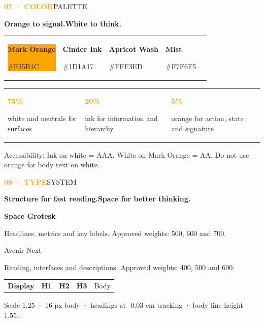 \documentclass[a4paper,10pt]{article}
\newcommand{\PageLabel}[2]{\noindent\textcolor{orange}{\footnotesize\bfseries #1}\hfill\textcolor{ink!55}{\footnotesize #2}\par\vspace{5mm}}
\newcommand{\Title}[1]{{\displayfont\bfseries\fontsize{34}{38}\selectfont\color{ink}#1\par}}
\newcommand{\Sub}[1]{{\fontsize{13}{19}\selectfont\color{ink!75}#1\par}}
\begin{document}
\PageLabel{07 · COLOR}{PALETTE}
\Title{Orange to signal.\newline White to think.}
\vspace{6mm}
\begin{tabularx}{\textwidth}{@{}Y@{\hspace{5mm}}Y@{\hspace{5mm}}Y@{\hspace{5mm}}Y@{\hspace{5mm}}Y@{}}
\colorbox{orange}{\parbox[c][30mm][c]{\linewidth}{\centering\color{white}\bfseries Mark Orange\par\small \#F35B1C}}&
\colorbox{ink}{\parbox[c][30mm][c]{\linewidth}{\centering\color{white}\bfseries Cinder Ink\par\small \#1D1A17}}&
\colorbox{cream}{\parbox[c][30mm][c]{\linewidth}{\centering\color{ink}\bfseries Apricot Wash\par\small \#FFF3ED}}&
\colorbox{mist}{\parbox[c][30mm][c]{\linewidth}{\centering\color{ink}\bfseries Mist\par\small \#F7F6F5}}&
\end{tabularx}
\vspace{8mm}
\begin{tabularx}{\textwidth}{@{}Y Y Y@{}}
\textcolor{orange}{\bfseries 75\%}\par\small white and neutrals for surfaces&
\textcolor{orange}{\bfseries 20\%}\par\small ink for information and hierarchy&
\textcolor{orange}{\bfseries 5\%}\par\small orange for action, state and signature
\end{tabularx}
\vfill\Sub{Accessibility: Ink on white = AAA. White on Mark Orange = AA. Do not use orange for body text on white.}\newpage

\PageLabel{08 · TYPE}{SYSTEM}
\Title{Structure for fast reading.\newline Space for better thinking.}
\vspace{5mm}
{\displayfont\bfseries\fontsize{34}{38}\selectfont Space Grotesk\par}
\small Headlines, metrics and key labels. Approved weights: 500, 600 and 700.\par\vspace{5mm}
{\fontsize{25}{30}\selectfont Avenir Next\par}
\small Reading, interfaces and descriptions. Approved weights: 400, 500 and 600.\par\vspace{6mm}
\begin{tabularx}{\textwidth}{@{}Y Y Y Y Y@{}}
\displayfont\bfseries\fontsize{30}{30}\selectfont Display&\displayfont\bfseries\fontsize{24}{24}\selectfont H1&\displayfont\bfseries\fontsize{19}{19}\selectfont H2&\displayfont\bfseries\fontsize{15}{15}\selectfont H3&\fontsize{12}{17}\selectfont Body
\end{tabularx}
\vfill\Sub{Scale 1.25 · 16 px body · headings at -0.03 em tracking · body line-height 1.55.}\newpage
\end{document}
